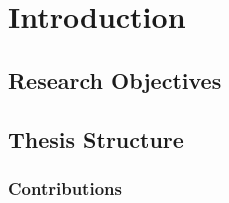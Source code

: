 \documentclass[../main/Progress.tex]{subfiles}
\begin{document}
	\chapter*{Introduction}
	\section*{Research Objectives}
	\section*{Thesis Structure}
	\subsection*{Contributions}
\end{document}
